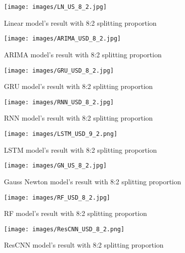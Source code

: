 \documentclass{ieeeojies}
\begin{document}
\begin{figure}[H]
  \centering
  \begin{minipage}{0.8\linewidth}
    \centering
    \texttt{[image: images/LN\_US\_8\_2.jpg]}
    \caption{Linear model's result with 8:2 splitting proportion}
    \label{fig15}
  \end{minipage}
\end{figure}
\begin{figure}[H]
  \centering
  \begin{minipage}{0.8\linewidth}
    \centering
    \texttt{[image: images/ARIMA\_USD\_8\_2.jpg]}
    \caption{ARIMA model's result with 8:2 splitting proportion}
    \label{fig16}
  \end{minipage}
\end{figure}
\begin{figure}[H]
  \centering
  \begin{minipage}{0.8\linewidth}
    \centering
    \texttt{[image: images/GRU\_USD\_8\_2.jpg]}
    \caption{GRU model's result with 8:2 splitting proportion}
    \label{fig17}
  \end{minipage}
\end{figure}
\begin{figure}[H]
  \centering
  \begin{minipage}{0.8\linewidth}
    \centering
    \texttt{[image: images/RNN\_USD\_8\_2.jpg]}
    \caption{RNN model's result with 8:2 splitting proportion}
    \label{fig18}
  \end{minipage}
\end{figure}
\begin{figure}[H]
  \centering
  \begin{minipage}{0.8\linewidth}
    \centering
    \texttt{[image: images/LSTM\_USD\_9\_2.png]}
    \caption{LSTM model's result with 8:2 splitting proportion}
    \label{fig19}
  \end{minipage}
\end{figure}
\begin{figure}[H]
  \centering
  \begin{minipage}{0.8\linewidth}
    \centering
    \texttt{[image: images/GN\_US\_8\_2.jpg]}
    \caption{Gauss Newton model's result with 8:2 splitting proportion}
    \label{fig20}
  \end{minipage}
\end{figure}
\begin{figure}[H]
  \centering
  \begin{minipage}{0.8\linewidth}
    \centering
    \texttt{[image: images/RF\_USD\_8\_2.jpg]}
    \caption{RF model's result with 8:2 splitting proportion}
    \label{fig21}
  \end{minipage}
\end{figure}
\begin{figure}[H]
  \centering
  \begin{minipage}{0.8\linewidth}
    \centering
    \texttt{[image: images/ResCNN\_USD\_8\_2.png]}
    \caption{ResCNN model's result with 8:2 splitting proportion}
    \label{mbbbggg}
  \end{minipage}
\end{figure}
\end{document}
